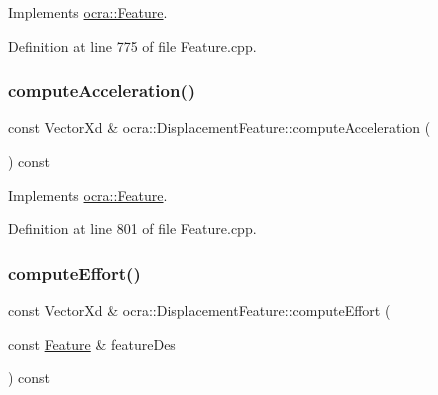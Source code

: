 Implements \hyperlink{classocra_1_1Feature_a4a5973d27459d2dececec8dc73038df8}{ocra\+::\+Feature}.



Definition at line 775 of file Feature.\+cpp.

\hypertarget{classocra_1_1DisplacementFeature_a1f2fa6644359c3897ac8d3e4e06c5f81}{}\label{classocra_1_1DisplacementFeature_a1f2fa6644359c3897ac8d3e4e06c5f81} 
\subsubsection{\texorpdfstring{compute\+Acceleration()}{computeAcceleration()}\hspace{0.1cm}{\footnotesize\ttfamily [2/2]}}
{\footnotesize\ttfamily const Vector\+Xd \& ocra\+::\+Displacement\+Feature\+::compute\+Acceleration (\begin{DoxyParamCaption}{ }\end{DoxyParamCaption}) const\hspace{0.3cm}{\ttfamily [virtual]}}



Implements \hyperlink{classocra_1_1Feature_aa42b61d4255116caa92042d01ca36b79}{ocra\+::\+Feature}.



Definition at line 801 of file Feature.\+cpp.

\hypertarget{classocra_1_1DisplacementFeature_a328fae77ec8a9942881e42226250a11b}{}\label{classocra_1_1DisplacementFeature_a328fae77ec8a9942881e42226250a11b} 
\subsubsection{\texorpdfstring{compute\+Effort()}{computeEffort()}\hspace{0.1cm}{\footnotesize\ttfamily [1/2]}}
{\footnotesize\ttfamily const Vector\+Xd \& ocra\+::\+Displacement\+Feature\+::compute\+Effort (\begin{DoxyParamCaption}\item[{const \hyperlink{classocra_1_1Feature}{Feature} \&}]{feature\+Des }\end{DoxyParamCaption}) const\hspace{0.3cm}{\ttfamily [virtual]}}



